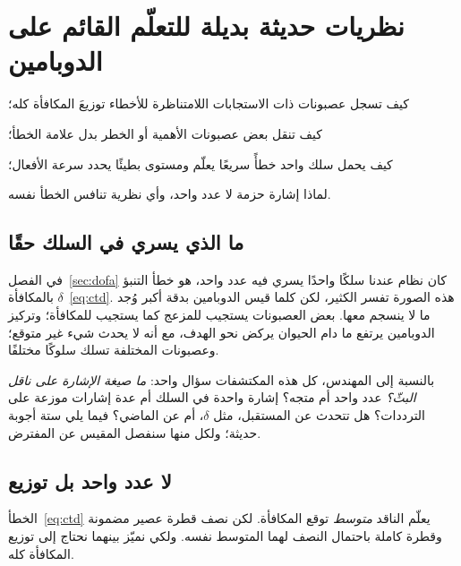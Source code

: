 \chapter{نظريات حديثة بديلة للتعلّم القائم على الدوبامين}
\label{sec:dofaalt}
\begin{chaptergoals}
\item كيف تسجل عصبونات  ذات الاستجابات اللامتناظرة للأخطاء توزيعَ المكافأة كله؛
\item كيف تنقل بعض عصبونات  الأهمية أو الخطر بدل علامة الخطأ؛
\item كيف يحمل سلك واحد خطأً سريعًا يعلّم ومستوى بطيئًا يحدد سرعة الأفعال؛
\item لماذا إشارة  حزمة لا عدد واحد، وأي نظرية تنافس الخطأ نفسه.
\end{chaptergoals}

\section{ما الذي يسري في السلك حقًا}

في الفصل~\ref{sec:dofa} كان نظام  عندنا سلكًا واحدًا يسري فيه عدد واحد، هو خطأ التنبؤ بالمكافأة $\delta$~\eqref{eq:ctd}. هذه الصورة تفسر الكثير، لكن كلما قيس الدوبامين بدقة أكبر وُجد ما لا ينسجم معها. بعض العصبونات يستجيب للمزعج كما يستجيب للمكافأة؛ وتركيز الدوبامين يرتفع ما دام الحيوان يركض نحو الهدف، مع أنه لا يحدث شيء غير متوقع؛ وعصبونات  المختلفة تسلك سلوكًا مختلفًا.

بالنسبة إلى المهندس، كل هذه المكتشفات سؤال واحد: \emph{ما صيغة الإشارة على ناقل البثّ؟} عدد واحد أم متجه؟ إشارة واحدة في السلك أم عدة إشارات موزعة على الترددات؟ هل تتحدث عن المستقبل، مثل $\delta$، أم عن الماضي؟ فيما يلي ستة أجوبة حديثة؛ ولكل منها سنفصل المقيس عن المفترض.

\section{لا عدد واحد بل توزيع}

الخطأ~\eqref{eq:ctd} يعلّم الناقد \emph{متوسط} توقع المكافأة. لكن نصف قطرة عصير مضمونة وقطرة كاملة باحتمال النصف لهما المتوسط نفسه. ولكي نميّز بينهما نحتاج إلى توزيع المكافأة كله.

